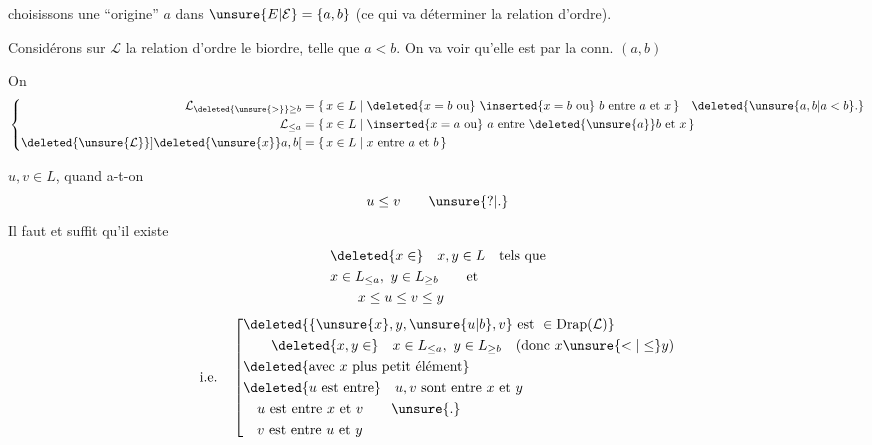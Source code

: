  choisissons une ``origine'' $a$ dans $\unsure{E|\mathcal E}=\{a,b\}$ (ce qui va déterminer la relation d'ordre).

  Considérons sur $\mathcal L$ la relation d'ordre  le biordre, telle que $a<b$. On va voir qu'elle est   par la conn.   $(a,b)$

On  
\[
\left\{\begin{aligned}
\mathcal L_{\deleted{\unsure{>}}\geq b}&=\{\,x\in L\mid\deleted{x=b\text{ ou}}\ \inserted{x=b\text{ ou}}\ b\text{ entre }a\text{ et }x\,\}\quad\deleted{\unsure{a,b|a<b}.}\\
\mathcal L_{\leq a}&=\{\,x\in L\mid\inserted{x=a\text{ ou}}\ a\text{ entre }\deleted{\unsure{a}}b\text{ et }x\,\}\\
\deleted{\unsure{\mathcal L}}\mathopen{]}\deleted{\unsure{x}}a,b\mathclose{[}&=\{\,x\in L\mid x\text{ entre }a\text{ et }b\,\}
\end{aligned}\right.
\]

 $u,v\in L$, quand a-t-on
\[
u\leq v\qquad\unsure{\mathord{?}|.}
\]
Il faut et suffit qu'il existe
\[
\begin{aligned}
&\deleted{x\in}\quad x,y\in L\quad\text{tels que}\\
&x\in L_{\leq a},\ y\in L_{\geq b}\qquad\text{et}\\
&\hspace{2em}x\leq u\leq v\leq y
\end{aligned}
\]
\[
\text{i.e.}\quad
\left[\begin{aligned}
&\deleted{\{\unsure{x},y,\unsure{u|b},v\}\ \text{est }\in\mathrm{Drap}(\mathcal L)}\\
&\qquad\deleted{x,y\in}\quad x\in L_{\leq a},\ y\in L_{\geq b}\quad(\text{donc }x\unsure{<|\leq}y)\\
&\deleted{\text{avec }x\text{ plus petit élément}}\\
&\deleted{u\text{ est entre}}\quad u,v\text{ sont entre }x\text{ et }y\\
&\quad u\text{ est entre }x\text{ et }v\qquad\unsure{.}\\
&\quad v\text{ est entre }u\text{ et }y
\end{aligned}\right.
\]

